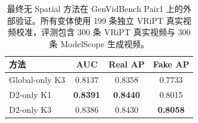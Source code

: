 \begin{table}[!t]
  \centering
  \caption{最终无 Spatial 方法在 GenVidBench Pair1 上的外部验证。所有变体使用 199 条独立 VRiPT 真实视频校准，评测包含 300 条 VRiPT 真实视频与 300 条 ModelScope 生成视频。}
  \label{tab:u0_external_validation}
  \begin{tabular}{lccc}
    \toprule
    方法 & AUC & Real AP & Fake AP \\
    \midrule
    Global-only K3 & 0.8137 & 0.8358 & 0.7733 \\
    D2-only K1 & \textbf{0.8391} & \textbf{0.8440} & 0.8015 \\
    D2-only K3 & 0.8386 & 0.8430 & \textbf{0.8058} \\
    \bottomrule
  \end{tabular}
\end{table}
